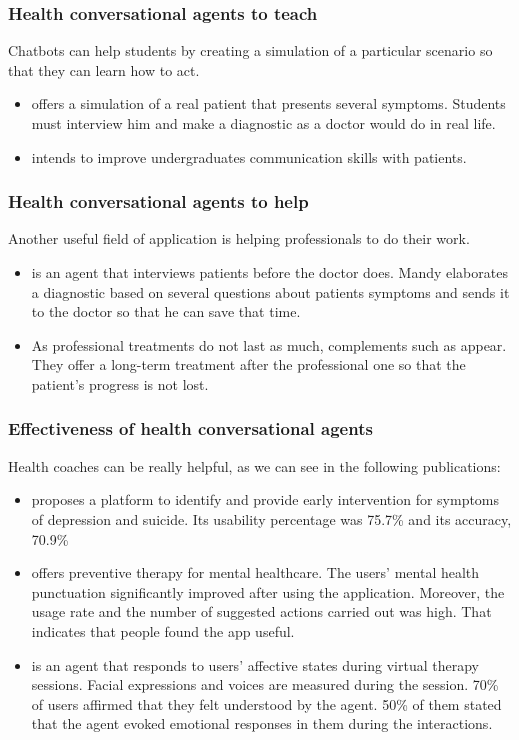 \documentclass[12pt,english]{article}
\begin{document}
\subsubsection{Health conversational agents to teach}

Chatbots can help students by creating a simulation of a particular scenario so that they can learn how to act.
\begin{itemize}
  \item \cite{Lopez2008194} offers a simulation of a real patient that presents several symptoms. Students must interview him and make a diagnostic as a doctor would do in real life.
  \item \cite{Shorey2019e14658} intends to improve undergraduates communication skills with patients.
\end{itemize}


\subsubsection{Health conversational agents to help}

Another useful field of application is helping professionals to do their work.

\begin{itemize}
  \item \cite{Ni201738} is an agent that interviews patients before the doctor does. Mandy elaborates a diagnostic based on several questions about patients symptoms and sends it to the doctor so that he can save that time.
  \item As professional treatments do not last as much, complements such as \cite{DAlfonso2017} appear. They offer a long-term treatment after the professional one so that the patient's progress is not lost.
\end{itemize}

\subsubsection{Effectiveness of health conversational agents}

Health coaches can be really helpful, as we can see in the following publications:

\begin{itemize}
  \item \cite{Breso2016297} proposes a platform to identify and provide early intervention for symptoms of depression and suicide. Its usability percentage was 75.7\% and its accuracy, 70.9\%
  \item \cite{Hirano2017} offers preventive therapy for mental healthcare. The users' mental health punctuation significantly improved after using the application. Moreover, the usage rate and the number of suggested actions carried out was high. That indicates that people found the app useful.
  \item \cite{Ring2016} is an agent that responds to users' affective states during virtual therapy sessions. Facial expressions and voices are measured during the session. 70\% of users affirmed that they felt understood by the agent. 50\% of them stated that the agent evoked emotional responses in them during the interactions.
\end{itemize}
\end{document}
